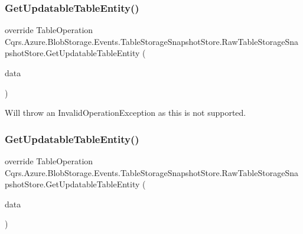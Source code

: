 \subsubsection{\texorpdfstring{Get\+Updatable\+Table\+Entity()}{GetUpdatableTableEntity()}\hspace{0.1cm}{\footnotesize\ttfamily [1/2]}}
{\footnotesize\ttfamily override Table\+Operation Cqrs.\+Azure.\+Blob\+Storage.\+Events.\+Table\+Storage\+Snapshot\+Store.\+Raw\+Table\+Storage\+Snapshot\+Store.\+Get\+Updatable\+Table\+Entity (\begin{DoxyParamCaption}\item[{\hyperlink{classCqrs_1_1Events_1_1EventData}{Event\+Data}}]{data }\end{DoxyParamCaption})\hspace{0.3cm}{\ttfamily [protected]}}



Will throw an Invalid\+Operation\+Exception as this is not supported. 

\mbox{\label{classCqrs_1_1Azure_1_1BlobStorage_1_1Events_1_1TableStorageSnapshotStore_1_1RawTableStorageSnapshotStore_ac3ead9ef0bc43493ebcd2f18ef4e2901_ac3ead9ef0bc43493ebcd2f18ef4e2901}} 
\subsubsection{\texorpdfstring{Get\+Updatable\+Table\+Entity()}{GetUpdatableTableEntity()}\hspace{0.1cm}{\footnotesize\ttfamily [2/2]}}
{\footnotesize\ttfamily override Table\+Operation Cqrs.\+Azure.\+Blob\+Storage.\+Events.\+Table\+Storage\+Snapshot\+Store.\+Raw\+Table\+Storage\+Snapshot\+Store.\+Get\+Updatable\+Table\+Entity (\begin{DoxyParamCaption}\item[{\hyperlink{classCqrs_1_1Azure_1_1BlobStorage_1_1EventDataTableEntity}{Event\+Data\+Table\+Entity}$<$ \hyperlink{classCqrs_1_1Events_1_1EventData}{Event\+Data} $>$}]{data }\end{DoxyParamCaption})\hspace{0.3cm}{\ttfamily [protected]}}



